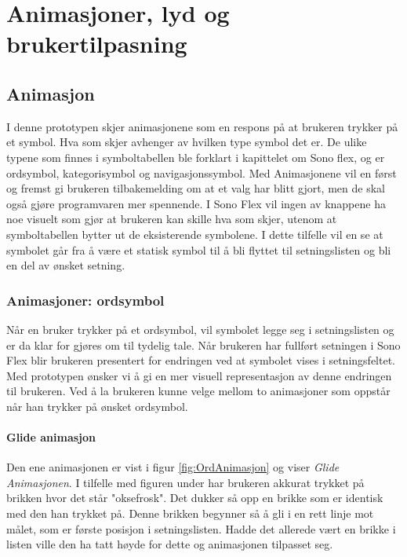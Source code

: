 \chapter{Animasjoner, lyd og brukertilpasning}
 
 
 
\section{Animasjon} 
 
 
I denne prototypen skjer animasjonene som en respons på at brukeren trykker på et symbol. Hva som skjer avhenger av hvilken type symbol det er. De ulike typene som finnes i symboltabellen ble forklart i kapittelet om Sono flex, og er ordsymbol, kategorisymbol og navigasjonssymbol. Med Animasjonene vil en først og fremst gi brukeren tilbakemelding om at et valg har blitt gjort, men de skal også gjøre programvaren mer spennende.  I Sono Flex vil ingen av knappene ha noe visuelt som gjør at brukeren kan skille hva som skjer, utenom at symboltabellen bytter ut de eksisterende symbolene. I dette tilfelle vil en se at symbolet går fra å være et statisk symbol til å bli flyttet til setningslisten og bli en del av ønsket setning.  
  
 
 
\subsection{Animasjoner: ordsymbol} 
 

Når en bruker trykker på et ordsymbol, vil symbolet legge seg i setningslisten og er da klar for gjøres om til tydelig tale. Når brukeren har fullført setningen i Sono Flex blir brukeren presentert for endringen ved at symbolet vises i setningsfeltet. Med prototypen ønsker vi  å gi en mer visuell representasjon av denne endringen til brukeren. Ved å la brukeren kunne velge mellom to animasjoner som oppstår når han trykker på ønsket ordsymbol. 

\subsubsection{Glide animasjon}
Den ene animasjonen er vist i figur \ref{fig:OrdAnimasjon} og viser \textit{Glide Animasjonen}. I tilfelle med figuren under har brukeren akkurat trykket på brikken hvor det står "oksefrosk". Det dukker så opp en brikke som er identisk med den han trykket på. Denne brikken begynner så å gli i en rett linje mot målet, som er første posisjon i setningslisten. Hadde det allerede vært en brikke i listen ville den ha tatt høyde for dette og animasjonen tilpasset seg. 
 
